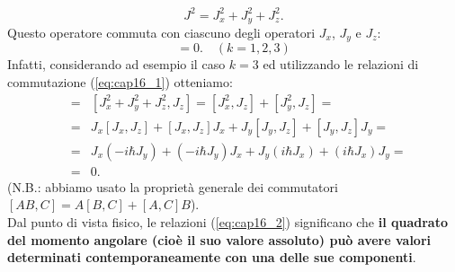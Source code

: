 \begin{equation}
J^2 = J_x ^2 + J_y ^2 + J_z ^2.
\end{equation}
Questo operatore commuta con ciascuno degli operatori $J_x$, $J_y$ e $J_z$:
\begin{equation}
[J^2, J_k]=0. \quad (k=1,2,3)
\label{eq:cap16_2}
\end{equation}
Infatti, considerando ad esempio il caso $k=3$ ed utilizzando le relazioni di commutazione (\ref{eq:cap16_1}) otteniamo:
\begin{eqnarray}
[J^2, J_z] &=& [J_x ^2+J_y^2+J_z ^2, J_z] = [J_x ^2, J_z]+[J_y ^2, J_z]= \nonumber \\
& =& J_x[J_x, J_z]+[J_x, J_z]J_x+J_y[J_y, J_z]+[J_y, J_z]J_y =  \nonumber \\
& = & J_x (-i\hbar J_y)+ (-i\hbar J_y)J_x+ J_y (i\hbar J_x)+(i\hbar J_x)J_y = \nonumber \\
& = & 0.  
\end{eqnarray}
(N.B.: abbiamo usato la proprietà generale dei commutatori\\ $\displaystyle{[AB,C]=A[B,C]+[A,C]B}$).\\
Dal punto di vista fisico, le relazioni (\ref{eq:cap16_2}) significano che \textbf{il quadrato del momento angolare (cioè il suo valore assoluto) può avere valori determinati contemporaneamente con una delle sue componenti}.

